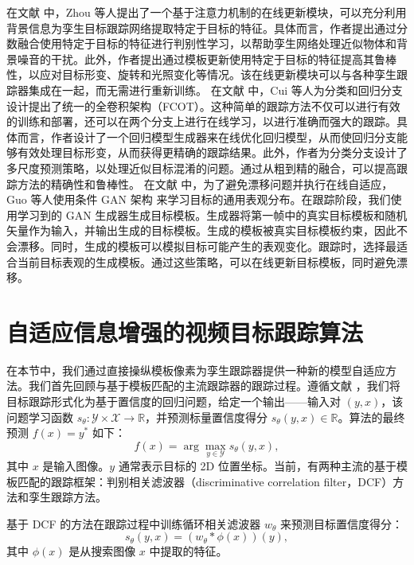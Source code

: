 在文献 \cite{DiscriminativeAnd} 中，Zhou 等人提出了一个基于注意力机制的在线更新模块，可以充分利用背景信息为孪生目标跟踪网络提取特定于目标的特征。具体而言，作者提出通过分数融合使用特定于目标的特征进行判别性学习，以帮助孪生网络处理近似物体和背景噪音的干扰。此外，作者提出通过模板更新使用特定于目标的特征提高其鲁棒性，以应对目标形变、旋转和光照变化等情况。该在线更新模块可以与各种孪生跟踪器集成在一起，而无需进行重新训练。%
在文献 \cite{FCOT} 中，Cui 等人为分类和回归分支设计提出了统一的全卷积架构（FCOT）。这种简单的跟踪方法不仅可以进行有效的训练和部署，还可以在两个分支上进行在线学习，以进行准确而强大的跟踪。具体而言，作者设计了一个回归模型生成器来在线优化回归模型，从而使回归分支能够有效处理目标形变，从而获得更精确的跟踪结果。此外，作者为分类分支设计了多尺度预测策略，以处理近似目标混淆的问题。通过从粗到精的融合，可以提高跟踪方法的精确性和鲁棒性。 %
在文献 \cite{TGGAN} 中，为了避免漂移问题并执行在线自适应，Guo 等人使用条件 GAN 架构 \cite{cGAN} 来学习目标的通用表观分布。在跟踪阶段，我们使用学习到的 GAN 生成器生成目标模板。生成器将第一帧中的真实目标模板和随机矢量作为输入，并输出生成的目标模板。生成的模板被真实目标模板约束，因此不会漂移。同时，生成的模板可以模拟目标可能产生的表观变化。跟踪时，选择最适合当前目标表观的生成模板。通过这些策略，可以在线更新目标模板，同时避免漂移。%

\section{自适应信息增强的视频目标跟踪算法}
在本节中，我们通过直接操纵模板像素为孪生跟踪器提供一种新的模型自适应方法。我们首先回顾与基于模板匹配的主流跟踪器的跟踪过程。遵循文献 \cite{Danelljan_2020_CVPR}，我们将目标跟踪形式化为基于置信度的回归问题，给定一个输出——输入对 $(y,x)$，该问题学习函数 $s_\theta:\mathcal{Y\times X\rightarrow \mathbb R}$，并预测标量置信度得分 $s_\theta(y,x)\in\mathbb R$。算法的最终预测 $f(x)=y^*$ 如下：
\begin{equation}
    f(x) = \arg\max_{y\in \mathcal Y}s_\theta (y,x),
\end{equation}
其中 $x$ 是输入图像。$y$ 通常表示目标的 2D 位置坐标。当前，有两种主流的基于模板匹配的跟踪框架：判别相关滤波器（discriminative correlation filter，DCF）方法和孪生跟踪方法。

基于 DCF 的方法在跟踪过程中训练循环相关滤波器 $w_{\theta}$ 来预测目标置信度得分：
\begin{equation}
    s_\theta(y,x)=(w_\theta * \phi(x))(y),
    \label{equ:dcf}
\end{equation}
其中 $\phi(x)$ 是从搜索图像 $x$ 中提取的特征。

